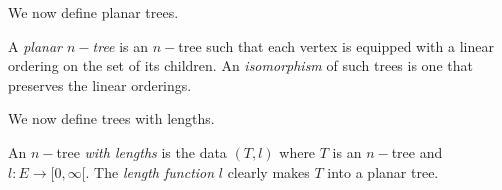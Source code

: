 We now define planar trees.

\begin{defn}\label{plts}
	A \emph{planar $n-$tree} is an $n-$tree such that each vertex is equipped with a linear ordering on the set of its children. An \emph{isomorphism} of such trees is one that preserves the linear orderings.
\end{defn}

We now define trees with lengths.

\begin{defn}\label{twl}
	An $n-$tree \emph{with lengths} is the data $(T,l)$ where $T$ is an $n-$tree and $l : E \to [0, \infty[$. The \emph{length function} $l$ clearly makes $T$ into a planar tree.
\end{defn}

